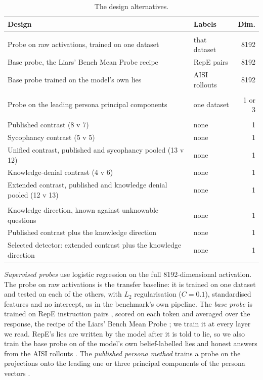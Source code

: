 \begin{table}[t]
\centering
\footnotesize
\caption{The design alternatives.}
\label{tab:alternatives}
\begin{tabularx}{\columnwidth}{@{}>{\raggedright\arraybackslash}X >{\raggedright\arraybackslash}p{1.75cm} r@{}}
\toprule
Design & Labels & Dim. \\
\midrule
\multicolumn{3}{@{}l}{\emph{Supervised probes}} \\
Probe on raw activations, trained on one dataset & that dataset & 8192 \\
Base probe, the Liars' Bench Mean Probe recipe & RepE pairs & 8192 \\
Base probe trained on the model's own lies & AISI rollouts \cite{aisi_lie_rollouts} & 8192 \\
\midrule
\multicolumn{3}{@{}l}{\emph{The published persona method}} \\
Probe on the leading persona principal components & one dataset & 1 or 3 \\
\midrule
\multicolumn{3}{@{}l}{\emph{Zero-shot persona contrasts}} \\
Published contrast (8 v 7) & none & 1 \\
Sycophancy contrast (5 v 5) & none & 1 \\
Unified contrast, published and sycophancy pooled (13 v 12) & none & 1 \\
Knowledge-denial contrast (4 v 6) & none & 1 \\
Extended contrast, published and knowledge denial pooled (12 v 13) & none & 1 \\
\midrule
\multicolumn{3}{@{}l}{\emph{The knowledge direction}} \\
Knowledge direction, known against unknowable questions & none & 1 \\
Published contrast plus the knowledge direction & none & 1 \\
Selected detector: extended contrast plus the knowledge direction & none & 1 \\
\bottomrule
\end{tabularx}
\end{table}

\emph{Supervised probes} use logistic regression on the full 8192-dimensional activation. The probe on
raw activations is the transfer baseline: it is trained on one dataset and tested on each of the
others, with $L_2$ regularisation ($C = 0.1$), standardised features and no intercept, as in the
benchmark's own pipeline. The \emph{base probe} is trained on RepE instruction pairs
\cite{zou2023representation}, scored on each token and averaged over the response, the recipe of the
Liars' Bench Mean Probe \cite{kretschmar2025liars}; we train it at every layer we read. RepE's lies are
written by the model after it is told to lie, so we also train the base probe on 
of the model's own belief-labelled lies and honest answers from the AISI rollouts
\cite{aisi_lie_rollouts}. The \emph{published persona method} trains a probe on the projections onto
the leading one or three principal components of the persona vectors \cite{mahadik2026persona}.

